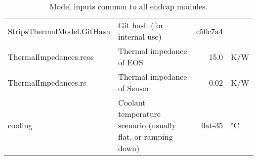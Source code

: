 \begin{table}[ht]
\begin{centering}
{\begin{tabular}{|l|l|r|l|}
StripsThermalModel.GitHash           & Git hash (for internal use)                                  &    c50c7a4 & --          \\ 
ThermalImpedances.reos               & Thermal impedance of EOS                                     &       15.0 & K/W         \\ 
ThermalImpedances.rs                 & Thermal impedance of Sensor                                  &       0.02 & K/W         \\ 
cooling                              & Coolant temperature scenario (usually flat, or ramping down) &    flat-35 & $^{\circ}$C \\ 
\hline\end{tabular}
} %
\end{centering}
\caption{Model inputs common to all endcap modules.}
\end{table}

